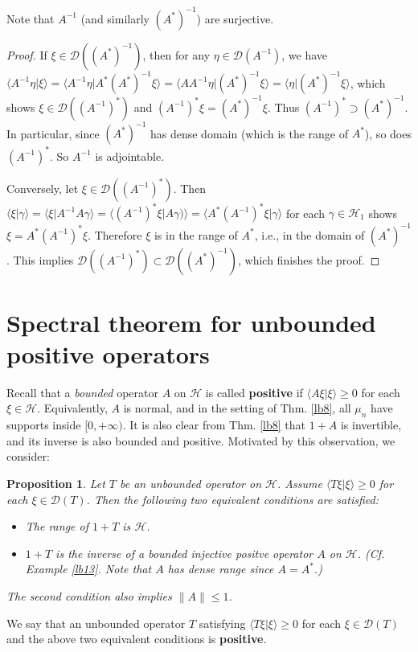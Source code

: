 \documentclass[12pt,b5paper,notitlepage]{article}
\theoremstyle{definition}
\theoremstyle{plain}
\newtheorem{pp}[df]{Proposition}
\newcommand{\mc}{\mathcal}
\newcommand{\Dom}{\scr D}
\newcommand{\bk}[1]{\langle {#1}\rangle}
\newcommand{\scr}{\mathscr}
\numberwithin{equation}{section}
\begin{document}
Note that $A^{-1}$ (and similarly $(A^*)^{-1}$) are surjective.

\begin{proof}
If $\xi\in \Dom((A^*)^{-1})$, then  for any $\eta\in\Dom(A^{-1})$, we have $\bk{A^{-1}\eta|\xi}=\bk{A^{-1}\eta|A^*(A^*)^{-1}\xi}=\bk{AA^{-1}\eta|(A^*)^{-1}\xi}=\bk{\eta|(A^*)^{-1}\xi}$, which shows $\xi\in\Dom((A^{-1})^*)$ and $(A^{-1})^*\xi=(A^*)^{-1}\xi$. Thus $(A^{-1})^*\supset(A^*)^{-1}$. In particular, since $(A^*)^{-1}$ has dense domain (which is the range of $A^*$), so does $(A^{-1})^*$. So $A^{-1}$ is adjointable.

Conversely, let $\xi\in \Dom((A^{-1})^*)$. Then $\bk{\xi|\gamma}=\bk{\xi|A^{-1}A\gamma}=\bk{(A^{-1})^*\xi|A\gamma)}=\bk{A^*(A^{-1})^*\xi|\gamma}$ for each $\gamma\in\mc H_1$ shows  $\xi=A^*(A^{-1})^*\xi$. Therefore $\xi$ is in the range of $A^*$, i.e., in the domain of $(A^*)^{-1}$. This implies $\Dom((A^{-1})^*)\subset\Dom((A^*)^{-1})$, which finishes the proof.
\end{proof}


\section{Spectral theorem for unbounded positive operators}

Recall that a \textit{bounded} operator $A$ on $\mc H$ is called \textbf{positive} if $\bk{A\xi|\xi}\geq 0$ for each $\xi\in\mc H$. Equivalently, $A$ is normal, and in the setting of Thm. \ref{lb8},  all $\mu_n$ have supports inside $[0,+\infty)$. It is also clear from Thm. \ref{lb8} that $1+A$ is invertible, and its inverse is also bounded and positive. Motivated by this observation, we consider:

\begin{pp}\label{lb11}
Let $T$ be an unbounded operator on $\mc H$. Assume $\bk{T\xi|\xi}\geq 0$ for each $\xi\in\Dom(T)$. Then  the following two equivalent conditions are satisfied:
\begin{itemize}
	\item The range of $1+T$ is $\mc H$.
	\item $1+T$ is the inverse of a bounded injective positve operator $A$ on $\mc H$. (Cf. Example \ref{lb13}. Note that $A$ has dense range since $A=A^*$.)
\end{itemize}
The second condition also implies $\lVert A\lVert\leq 1$. 
\end{pp}

We say that an unbounded operator $T$ satisfying $\bk{T\xi|\xi}\geq 0$ for each $\xi\in\Dom(T)$ and the above two equivalent conditions is \textbf{positive}.
\end{document}
